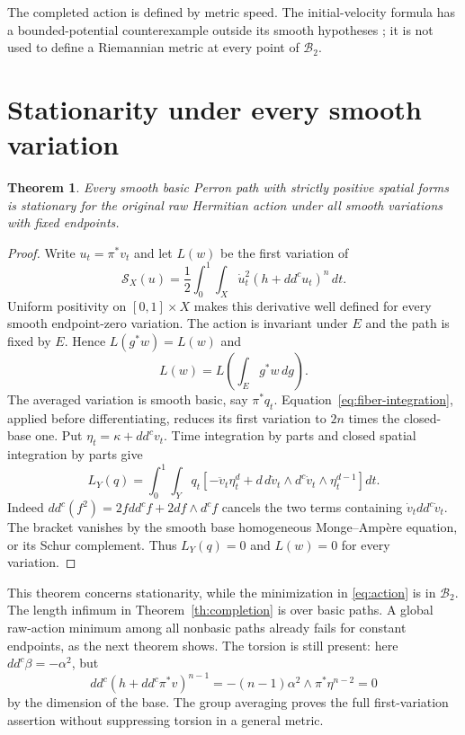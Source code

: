 \documentclass[11pt]{article}
\newcommand{\ddc}{dd^c}
\newcommand{\BB}{\mathcal B}
\newtheorem{theorem}{Theorem}
\theoremstyle{remark}\newtheorem{remark}[theorem]{Remark}
\begin{document}
The completed action is defined by metric speed. The initial-velocity
formula has a bounded-potential counterexample outside its smooth
hypotheses \cite[Section 7]{Darvas}; it is not used to define a
Riemannian metric at every point of $\BB_2$.

\section{Stationarity under every smooth variation}
\begin{theorem}\label{th:stationary}
Every smooth basic Perron path with strictly positive spatial forms is
stationary for the original raw Hermitian action under all smooth
variations with fixed endpoints.
\end{theorem}
\begin{proof}
Write $u_t=\pi^*v_t$ and let $L(w)$ be the first variation of
\[
 \mathcal S_X(u)=\frac12\int_0^1\int_X\dot u_t^2(h+\ddc u_t)^n\,dt.
\]
Uniform positivity on $[0,1]\times X$ makes this derivative well defined
for every smooth endpoint-zero variation. The action is invariant under
$E$ and the path is fixed by $E$. Hence $L(g^*w)=L(w)$ and
\[
 L(w)=L\left(\int_Eg^*w\,dg\right).
\]
The averaged variation is smooth basic, say $\pi^*q_t$.
Equation~\eqref{eq:fiber-integration}, applied before differentiating,
reduces its first variation to $2n$ times the closed-base one.
Put $\eta_t=\kappa+\ddc v_t$. Time integration by parts and closed
spatial integration by parts give
\[
 L_Y(q)=\int_0^1\int_Y q_t\left[
 -\ddot v_t\eta_t^d
 +d\,d\dot v_t\wedge d^c\dot v_t\wedge\eta_t^{d-1}\right]dt.
\]
Indeed $\ddc(f^2)=2f\ddc f+2df\wedge d^cf$ cancels the two
terms containing $\dot v_t\ddc\dot v_t$. The bracket vanishes by
the smooth base homogeneous Monge--Amp\`ere equation, or its Schur
complement. Thus $L_Y(q)=0$ and $L(w)=0$ for every variation.
\end{proof}

This theorem concerns stationarity, while the minimization in
\eqref{eq:action} is in $\BB_2$. The length infimum in
Theorem~\ref{th:completion} is over basic paths. A global raw-action
minimum among all nonbasic paths already fails for constant endpoints,
as the next theorem shows. The torsion is still present:
here $\ddc\beta=-\alpha^2$,
but
\[
 \ddc(h+\ddc\pi^*v)^{n-1}
   =-(n-1)\alpha^2\wedge\pi^*\eta^{n-2}=0
\]
by the dimension of the base. The group averaging proves the full
first-variation assertion without suppressing torsion in a general metric.
\end{document}
